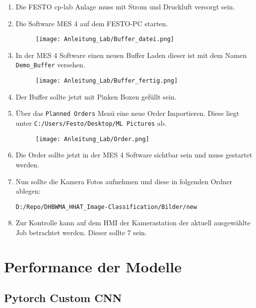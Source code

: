\begin{enumerate} 
    \item Die FESTO \ac{cp-lab} Anlage muss mit Strom und Druckluft versorgt sein.
    \item Die Software MES 4 auf dem FESTO-PC starten.
    \begin{figure}[H]
        \centering
        \texttt{[image: Anleitung\_Lab/Buffer\_datei.png]}
    \end{figure}
    \item In der MES 4 Software einen neuen Buffer Laden dieser ist mit dem Namen \texttt{Demo\_Buffer} versehen.
    \begin{figure}[H]
        \centering
        \texttt{[image: Anleitung\_Lab/Buffer\_fertig.png]}
    \end{figure}
    \item Der Buffer sollte jetzt mit Pinken Boxen gefüllt sein.
    \item Über das \texttt{Planned Orders} Menü eine neue Order Importieren. Diese liegt unter \texttt{C:/Users/Festo/Desktop/ML Pictures} ab.

    \begin{figure}[H]
        \centering
        \texttt{[image: Anleitung\_Lab/Order.png]}
    \end{figure}

    \item Die Order sollte jetzt in der MES 4 Software sichtbar sein und muss gestartet werden.
    \item Nun sollte die Kamera Fotos aufnehmen und diese in folgenden Ordner ablegen:
    
    \texttt{D:/Repo/DHBWMA\_HHAT\_Image-Classification/Bilder/new}

    \item Zur Kontrolle kann auf dem HMI der Kamerastation der aktuell ausgewählte Job betrachtet werden. Dieser sollte 7 sein.

\end{enumerate}

\section{Performance der Modelle} \label{sec:performance_der_modelle}

\subsection{Pytorch Custom CNN}

